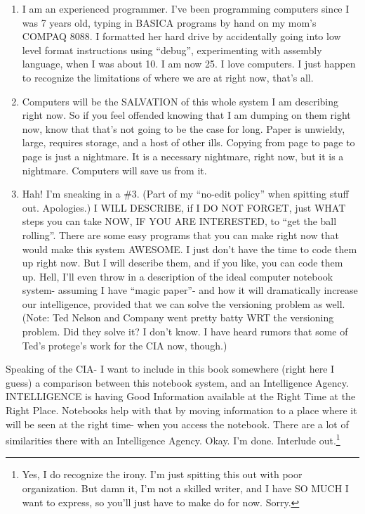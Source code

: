 \documentclass[oneside]{book}
\begin{document}
\begin{enumerate}
\item 
I am an experienced programmer. I've been programming computers
since I was 7 years old, typing in BASICA programs by hand on my
mom's COMPAQ 8088. I formatted her hard drive by accidentally going
into low level format instructions using ``debug'', experimenting
with assembly language, when I was about 10. I am now 25. I love
computers. I just happen to recognize the limitations of where
we are at right now, that's all.
\item Computers will be the SALVATION of this whole system I am
describing right now. So if you feel offended knowing that I am
dumping on them right now, know that that's not going to be the
case for long. Paper is unwieldy, large, requires storage, and a
host of other ills. Copying from page to page to page is just a
nightmare. It is a necessary nightmare, right now, but it is a
nightmare. Computers will save us from it.
\item Hah! I'm sneaking in a \#3. (Part of my ``no-edit policy'' when
spitting stuff out. Apologies.) I WILL DESCRIBE, if I DO
NOT FORGET, just WHAT steps you can take NOW, IF YOU ARE
INTERESTED, to ``get the ball rolling''. There are some easy
programs that you can make right now that would make this system
AWESOME. I just don't have the time to code them up right now. But
I will describe them, and if you like, you can code them up.
Hell, I'll even throw in a description of the ideal computer
notebook system- assuming I have ``magic paper''- and how it will
dramatically increase our intelligence, provided that we
can solve the versioning problem as well. (Note: Ted Nelson and
Company went pretty batty WRT the versioning problem. Did
they solve it? I don't know. I have heard rumors that some of
Ted's protege's work for the CIA now, though.)
\end{enumerate}

Speaking of the CIA- I want to include in this book somewhere (right
here I guess) a comparison between this notebook system, and an
Intelligence Agency. INTELLIGENCE is having Good Information available
at the Right Time at the Right Place. Notebooks help with that by
moving information to a place where it will be seen at the right time-
when you access the notebook. There are a lot of similarities there
with an Intelligence Agency. Okay. I'm done. Interlude out.\footnote{Yes, I do
recognize the irony. I'm just spitting this out with poor
organization. But damn it, I'm not a skilled writer, and I have SO MUCH
I want to express, so you'll just have to make do for now. Sorry.}
\end{document}
